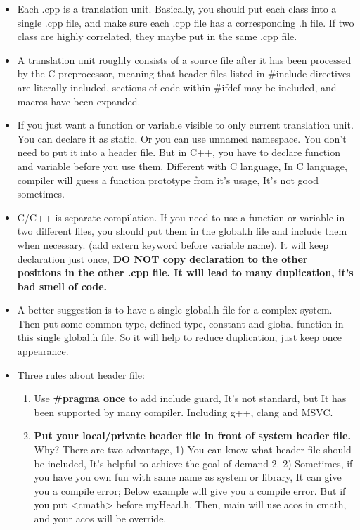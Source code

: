 \documentclass[a4paper,12pt,twoside]{book}
\begin{document}
\begin{itemize}

\item Each .cpp is a translation unit. Basically, you should put each class into a single .cpp file, and make sure each .cpp file has a corresponding .h file.  If two class are highly correlated, they maybe put in the same .cpp file.

\item A translation unit roughly consists of a source file after it has been processed by the C preprocessor, meaning that header files listed in \#include directives are literally included, sections of code within \#ifdef may be included, and macros have been expanded.


\item If you just want a function or  variable visible to only current translation unit. You can declare it as static. Or you can use unnamed namespace.  You don't need to put it into a header file.  But in C++, you have to declare function and variable before you use them. Different with C language, In C language, compiler will guess a function prototype from it's usage, It's not good sometimes.

\item C/C++ is separate compilation. If you need to use a function or variable in two different files, you should put them in the  global.h file and include them when necessary. (add extern keyword before variable name).  It will keep declaration just once, \textbf{DO NOT copy declaration to the other positions in the other .cpp file. It will lead to many duplication, it's bad smell of code.}

\item A better suggestion is to have a single global.h file for a complex system. Then put some common type, defined type, constant and global function in this single global.h file. So it will help to reduce duplication, just keep once appearance.

\item Three rules about header file:
\begin{enumerate}
\item Use \textbf{\#pragma once} to add include guard, It's not standard, but It has been supported by many compiler. Including g++, clang and MSVC.

\item \textbf{Put your local/private header file in front of system header file. }  Why? There are two advantage, 1) You can know what header file should be included, It's helpful to achieve the goal of demand 2.  2) Sometimes, if you have you own fun with same name as system or library, It can give you a compile error; Below example will give you a compile error. But if you put <cmath> before myHead.h. Then, main will use acos in cmath, and your acos will be override.


\end{enumerate}
\end{itemize}
\end{document}
